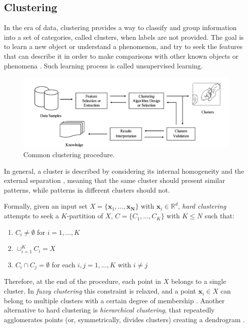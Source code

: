 \documentclass[a4paper, 12pt]{article} %
\begin{document}
	\subsection{ Clustering } \label{ssec:clustering}
	In the era of data, clustering provides a way to classify and group information into a set of categories, called clusters, when labels are not provided. The goal is to learn a new object or understand a phenomenon, and try to seek the features that can describe it in order to make comparisons with other known objects or phenomena \cite{ClusteringSurvey}. Such learning process is called unsupervised learning.
	\begin{figure} \label{fig:clustering_approach}
		\includegraphics[width=\linewidth]{img/clustering_approach.png}
		\caption{Common clustering procedure.}
	\end{figure}
	In general, a cluster is described by considering its internal homogeneity and the external separation \cite{ClusterHomogeinitySeparation}, meaning that the same cluster should present similar patterns, while patterns in different clusters should not.
	
	Formally, given an input set $X = \{ \pmb{x}_1, ..., \pmb{x_N} \}$ with $\pmb{x}_i \in \mathbb{R}^d$, \textit{hard clustering} attempts to seek a $K$-partition of $X$, $C = \{ C_1, ..., C_K \}$ with $K \leq N$ such that:
	\begin{enumerate}
		 \item $C_i \neq \emptyset$ for $i = 1, ..., K$
		 \item $\cup_{i=1}^{K} C_i = X$
		 \item $C_i \cap C_j = \emptyset$ for each $i, j = 1, ..., K$ with $i \neq j$
	\end{enumerate}
	Therefore, at the end of the procedure, each point in $X$ belongs to a single cluster. In \textit{fuzzy clustering} this constraint is relaxed, and a point $\pmb{x}_i \in X$ can belong to multiple clusters with a certain degree of membership \cite{FuzzyClustering}. Another alternative to hard clustering is \textit{hierarchical clustering}, that repeatedly agglomerates points (or, symmetrically, divides clusters) creating a dendrogram \cite{HierarchicalClustering}.  
	
\end{document}
